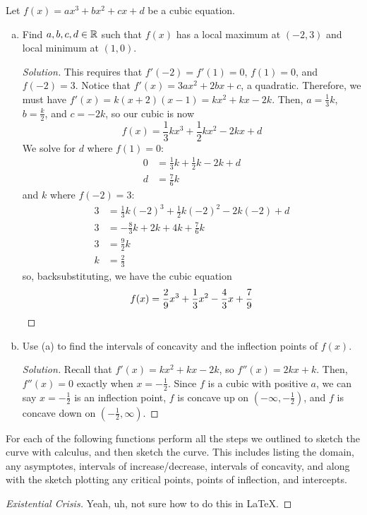 \documentclass{agony}
\begin{document}
\question Let $f(x)=ax^3+bx^2+cx+d$ be a cubic equation.
\begin{enumerate}[(a)]
  \item Find $a,b,c,d\in\mathbb{R}$ such that $f(x)$ has a local maximum at $(-2,3)$ and local minimum at $(1,0)$.
        \begin{proof}[Solution]
          This requires that $f'(-2)=f'(1)=0$, $f(1)=0$, and $f(-2)=3$.
          Notice that $f'(x) = 3ax^2+2bx+c$, a quadratic.
          Therefore, we must have $f'(x)=k(x+2)(x-1)=kx^2+kx-2k$.
          Then, $a=\frac13k$, $b=\frac{k}{2}$, and $c=-2k$, so our cubic is now
          \[ f(x) = \frac13kx^3 + \frac12kx^2 - 2kx + d \]
          We solve for $d$ where $f(1)=0$:
          \begin{align*}
            0 & = \frac13k + \frac12k - 2k + d \\
            d & = \frac76k
          \end{align*}
          and $k$ where $f(-2)=3$:
          \begin{align*}
            3 & = \frac13k(-2)^3 + \frac12k(-2)^2 - 2k(-2) + d \\
            3 & = -\frac83k + 2k + 4k + \frac76k               \\
            3 & = \frac92k                                     \\
            k & = \frac23
          \end{align*}
          so, backsubstituting, we have the cubic equation
          \[ f(x) = \frac{2}{9}x^3 + \frac{1}{3}x^2 - \frac{4}{3}x + \frac{7}{9} \qedhere \]
        \end{proof}
  \item Use (a) to find the intervals of concavity and the inflection points of $f(x)$.
        \begin{proof}[Solution]
          Recall that $f'(x)=kx^2+kx-2k$, so $f''(x)=2kx+k$.
          Then, $f''(x)=0$ exactly when $x=-\frac12$.
          Since $f$ is a cubic with positive $a$, we can say $x=-\frac12$ is an inflection point,
          $f$ is concave up on $(-\infty,-\frac12)$, and $f$ is concave down on $(-\frac12,\infty)$.
        \end{proof}
\end{enumerate}


\question For each of the following functions perform all the steps we outlined
to sketch the curve with calculus, and then sketch the curve.
This includes listing the domain, any asymptotes, intervals of increase/decrease,
intervals of concavity, and along with the sketch plotting any critical points,
points of inflection, and intercepts.
\begin{proof}[Existential Crisis]
  Yeah, uh, not sure how to do this in \LaTeX.
\end{proof}
\end{document}
